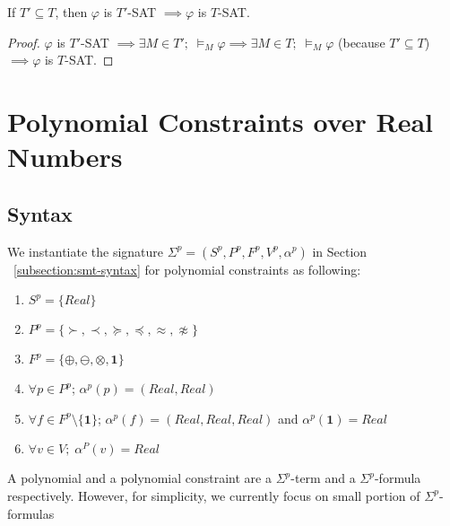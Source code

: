 \begin{lemma} \label{lemma:subtheory-SAT}
If $T' \subseteq T$, then $\varphi$ is $T'$-SAT $\implies \varphi$ is $T$-SAT.
\end{lemma}

\begin{proof}
$\varphi$ is $T'$-SAT $\implies \exists M \in T'; \; \models_M \varphi \implies \exists M \in T; \; \models_M \varphi$ (because $T' \subseteq T$) $\implies \varphi$ is $T$-SAT.
\end{proof}

\section{Polynomial Constraints over Real Numbers}
\subsection{Syntax}
We instantiate the signature $\Sigma^p = (S^p, P^p, F^p, V^p, \alpha^p)$ in Section ~\ref{subsection:smt-syntax} for polynomial constraints as following:
\begin{enumerate}
\item $S^p = \{Real\}$
\item $P^p = \{\succ, \prec, \succeq, \preceq, \approx, \not\approx\}$
\item $F^p = \{\oplus, \ominus, \otimes, \mathbf{1}\}$
\item $\forall p \in P^p$; $\alpha^p(p) = (Real, Real)$
\item $\forall f \in F^p\setminus \{\mathbf{1}\}$; $\alpha^p(f) = (Real, Real, Real)$ and $\alpha^p(\mathbf{1})=Real$
\item $\forall v \in V; \; \alpha^P(v) = Real$
\end{enumerate}
A polynomial and a polynomial constraint are a $\Sigma^p$-term and a $\Sigma^p$-formula respectively. However, for simplicity, we currently focus on small portion of $\Sigma^p$-formulas

